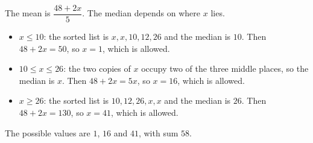 The mean is $\dfrac{48+2x}{5}$. The median depends on where $x$ lies.
\begin{itemize}
\item $x\le10$: the sorted list is $x,x,10,12,26$ and the median is $10$. Then $48+2x=50$, so $x=1$, which is allowed.
\item $10\le x\le26$: the two copies of $x$ occupy two of the three middle places, so the median is $x$. Then $48+2x=5x$, so $x=16$, which is allowed.
\item $x\ge26$: the sorted list is $10,12,26,x,x$ and the median is $26$. Then $48+2x=130$, so $x=41$, which is allowed.
\end{itemize}
The possible values are $1$, $16$ and $41$, with sum $\boxed{58}$.
